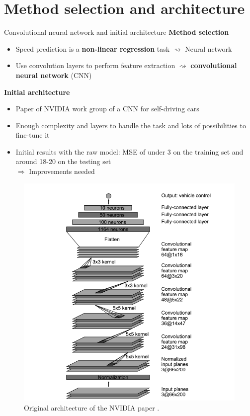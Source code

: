 \section{Method selection and architecture}

\begin{frame}{Convolutional neural network and initial architecture}
\textbf{Method selection}
\begin{itemize}
\item Speed prediction is a \textbf{non-linear regression} task $\rightsquigarrow$ Neural network
\item Use convolution layers to perform feature extraction $\rightsquigarrow$ \textbf{convolutional neural network} (CNN)
\end{itemize}
\textbf{Initial architecture}
\begin{itemize}
\item Paper of NVIDIA work group \cite{NVIDIA2016} of a CNN for self-driving cars
\item Enough complexity and layers to handle the task and lots of possibilities to fine-tune it
\item Initial results with the raw model: MSE of under 3 on the training set and around 18-20 on the testing set\\
$\Rightarrow$ Improvements needed
\end{itemize}
\end{frame}

\begin{frame}[plain]
\begin{figure}
\centering
\includegraphics[scale=0.3]{./imgs/NetworkOriginal.png}
\caption{Original architecture of the NVIDIA paper \cite{NVIDIA2016}.}
\end{figure}
\end{frame}